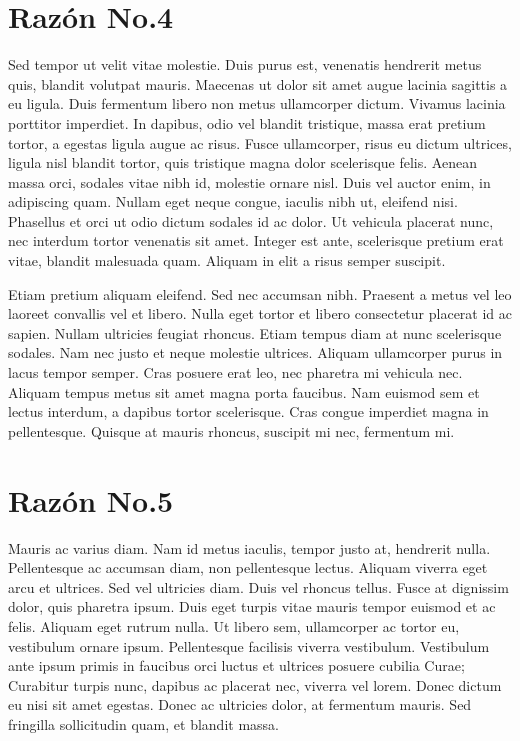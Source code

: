 \documentclass[11pt,letterpaper]{article}
\begin{document}
\section{Razón No.4}

Sed tempor ut velit vitae molestie. Duis purus est, venenatis hendrerit metus quis, blandit volutpat mauris. Maecenas ut dolor sit amet augue lacinia sagittis a eu ligula. Duis fermentum libero non metus ullamcorper dictum. Vivamus lacinia porttitor imperdiet. In dapibus, odio vel blandit tristique, massa erat pretium tortor, a egestas ligula augue ac risus. Fusce ullamcorper, risus eu dictum ultrices, ligula nisl blandit tortor, quis tristique magna dolor scelerisque felis. Aenean massa orci, sodales vitae nibh id, molestie ornare nisl. Duis vel auctor enim, in adipiscing quam. Nullam eget neque congue, iaculis nibh ut, eleifend nisi. Phasellus et orci ut odio dictum sodales id ac dolor. Ut vehicula placerat nunc, nec interdum tortor venenatis sit amet. Integer est ante, scelerisque pretium erat vitae, blandit malesuada quam. Aliquam in elit a risus semper suscipit.

Etiam pretium aliquam eleifend. Sed nec accumsan nibh. Praesent a metus vel leo laoreet convallis vel et libero. Nulla eget tortor et libero consectetur placerat id ac sapien. Nullam ultricies feugiat rhoncus. Etiam tempus diam at nunc scelerisque sodales. Nam nec justo et neque molestie ultrices. Aliquam ullamcorper purus in lacus tempor semper. Cras posuere erat leo, nec pharetra mi vehicula nec. Aliquam tempus metus sit amet magna porta faucibus. Nam euismod sem et lectus interdum, a dapibus tortor scelerisque. Cras congue imperdiet magna in pellentesque. Quisque at mauris rhoncus, suscipit mi nec, fermentum mi.

\section{Razón No.5}

Mauris ac varius diam. Nam id metus iaculis, tempor justo at, hendrerit nulla. Pellentesque ac accumsan diam, non pellentesque lectus. Aliquam viverra eget arcu et ultrices. Sed vel ultricies diam. Duis vel rhoncus tellus. Fusce at dignissim dolor, quis pharetra ipsum. Duis eget turpis vitae mauris tempor euismod et ac felis. Aliquam eget rutrum nulla. Ut libero sem, ullamcorper ac tortor eu, vestibulum ornare ipsum. Pellentesque facilisis viverra vestibulum. Vestibulum ante ipsum primis in faucibus orci luctus et ultrices posuere cubilia Curae; Curabitur turpis nunc, dapibus ac placerat nec, viverra vel lorem. Donec dictum eu nisi sit amet egestas. Donec ac ultricies dolor, at fermentum mauris. Sed fringilla sollicitudin quam, et blandit massa.
\end{document}
